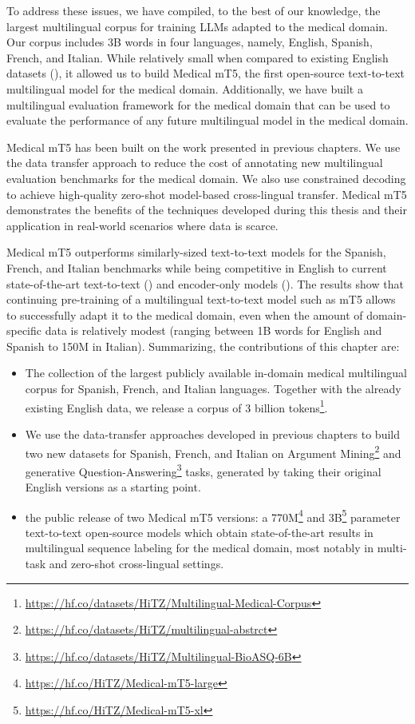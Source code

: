 To address these issues, we have compiled, to the best of our knowledge, the largest multilingual corpus for training LLMs adapted to the medical domain. Our corpus includes 3B words in four languages, namely, English, Spanish, French, and Italian. While relatively small when compared to existing English datasets (\cite{wu2023pmcllama}), it allowed us to build Medical mT5, the first open-source text-to-text multilingual model for the medical domain. Additionally, we have built a multilingual evaluation framework for the medical domain that can be used to evaluate the performance of any future multilingual model in the medical domain. 

Medical mT5 has been built on the work presented in previous chapters. We use the data transfer approach to reduce the cost of annotating new multilingual evaluation benchmarks for the medical domain. We also use constrained decoding to achieve high-quality zero-shot model-based cross-lingual transfer. Medical mT5 demonstrates the benefits of the techniques developed during this thesis and their application in real-world scenarios where data is scarce.

Medical mT5 outperforms similarly-sized text-to-text models for the Spanish, French, and Italian benchmarks while being competitive in English to current state-of-the-art text-to-text (\cite{mt5,chung-flan-instruction-models}) and encoder-only models (\cite{DBLP:journals/bioinformatics/LeeYKKKSK20,DBLP:conf/iclr/HeLGC21/deberta}). The results show that continuing pre-training of a multilingual text-to-text model such as mT5 allows to successfully adapt it to the medical domain, even when the amount of domain-specific data is relatively modest (ranging between 1B words for English and Spanish to 150M in Italian). Summarizing, the contributions of this chapter are:



\begin{itemize}
    \item The collection of the largest publicly available in-domain medical multilingual corpus for Spanish, French, and Italian languages. Together with the already existing English data, we release a corpus of 3 billion tokens\footnote{\url{https://hf.co/datasets/HiTZ/Multilingual-Medical-Corpus}}.
    \item We use the data-transfer approaches developed in previous chapters to build two new datasets for Spanish, French, and Italian on Argument Mining\footnote{\url{https://hf.co/datasets/HiTZ/multilingual-abstrct}} and generative Question-Answering\footnote{\url{https://hf.co/datasets/HiTZ/Multilingual-BioASQ-6B}} tasks, generated by taking their original English versions as a starting point.
    \item the public release of two Medical mT5 versions: a 770M\footnote{\url{https://hf.co/HiTZ/Medical-mT5-large}} and 3B\footnote{\url{https://hf.co/HiTZ/Medical-mT5-xl}} parameter text-to-text open-source models which obtain state-of-the-art results in multilingual sequence labeling for the medical domain, most notably in multi-task and zero-shot cross-lingual settings.
\end{itemize}


